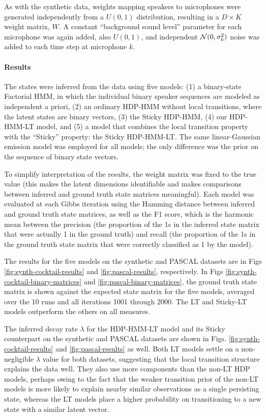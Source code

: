 As with the synthetic data, weights mapping speakers to microphones 
were generated independently from
a $U(0,1)$ distribution, resulting in a $D \times K$ weight matrix,
$W$.  A constant ``background sound level'' parameter for each
microphone was again added,
also $U(0,1)$, and independent $\mathcal{N}(0,\sigma^2_k)$ noise was added
to each time step at microphone $k$.

\paragraph{Results}
The states were inferred from the data using five models: 
(1) a binary-state Factorial HMM, in which the
individual binary speaker sequences are modeled as independent a
priori, (2) an ordinary HDP-HMM without local transitions, where the
latent states are binary vectors, (3) the Sticky HDP-HMM, (4) our
HDP-HMM-LT model, and (5) a model that combines the local transition
property with the ``Sticky'' property: the Sticky HDP-HMM-LT.  
The same linear-Gaussian emission model was employed for all models; 
the only difference was the prior on the sequence of binary state vectors.

To simplify interpretation of the results, the weight matrix
was fixed to the true value (this makes the latent dimensions
identifiable and makes comparisons between inferred and ground truth
state matrices meaningful).  Each model was evaluated at each Gibbs
iteration using the Hamming distance between inferred 
and ground truth state matrices, as well as the F1 score, which is the harmonic mean between the precision (the proportion of the 1s in the inferred state matrix that were actually 1 in the ground truth) and recall (the proportion of the 1s in the ground truth state matrix that were correctly classified as 1 by the model).

The results for the five models on the synthetic and PASCAL datasets are in Figs
\ref{fig:synth-cocktail-results} and \ref{fig:pascal-results},
respectively.  
In Figs \ref{fig:synth-cocktail-binary-matrices} and
\ref{fig:pascal-binary-matrices}, the ground truth state
matrix is shown against the expected state matrix for the five models,
averaged over the 10 runs and all iterations 1001 through 2000.  
The LT and Sticky-LT models outperform the others on all measures. 

The inferred decay rate $\lambda$ for the
HDP-HMM-LT model and its Sticky counterpart on the synthetic and
PASCAL datasets are shown in Figs. \ref{fig:synth-cocktail-results}
and \ref{fig:pascal-results} as well.  Both LT models settle 
on a non-negligible $\lambda$ value for both datasets, suggesting that 
the local transition structure explains the data well.  
They also use more components than the non-LT HDP
models, perhaps owing to the fact that the weaker transition prior of
the non-LT models is more likely to explain nearby similar observations
as a single persisting state, whereas the LT models place a higher
probability on transitioning to a new state with a similar latent vector.

